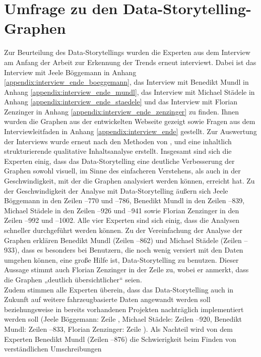 \section{Umfrage zu den Data-Storytelling-Graphen}
Zur Beurteilung des Data-Storytellings wurden die Experten aus dem Interview am Anfang der Arbeit zur Erkennung der Trends erneut interviewt. Dabei ist das Interview mit Jeele Böggemann in Anhang \ref{appendix:interview_ende_boeggemann}, das Interview mit Benedikt Mundl in Anhang \ref{appendix:interview_ende_mundl}, das Interview mit Michael Städele in Anhang \ref{appendix:interview_ende_staedele} und das Interview mit Florian Zenzinger in Anhang \ref{appendix:interview_ende_zenzinger} zu finden. Ihnen wurden die Graphen aus der entwickelten Webseite gezeigt sowie Fragen aus dem Interviewleitfaden in Anhang \ref{appendix:interview_ende} gestellt. Zur Auswertung der Interviews wurde erneut nach den Methoden von \cite{Mayring.2022}, \cite{Kuckartz.2022} und \cite{AndreMorgensternEinenkel.2023} eine inhaltlich strukturierende qualitative Inhaltsanalyse erstellt. Insgesamt sind sich die Experten einig, dass das Data-Storytelling eine deutliche Verbesserung der Graphen sowohl visuell, im Sinne des einfacheren Verstehens, als auch in der Geschwindigkeit, mit der die Graphen analysiert werden können, erreicht hat. Zu der Geschwindigkeit der Analyse mit Data-Storytelling äußern sich Jeele Böggemann in den Zeilen --770 und --786, Benedikt Mundl in den Zeilen --839, Michael Städele in den Zeilen --926 und --941 sowie Florian Zenzinger in den Zeilen --992 und --1002. Alle vier Experten sind sich einig, dass die Analysen schneller durchgeführt werden können. Zu der Vereinfachung der Analyse der Graphen erklären Benedikt Mundl (Zeilen --862) und Michael Städele (Zeilen --933), dass es besonders bei Benutzern, die noch wenig versiert mit den Daten umgehen können, eine große Hilfe ist, Data-Storytelling zu benutzen. Dieser Aussage stimmt auch Florian Zenzinger in der Zeile  zu, wobei er anmerkt, dass die Graphen „deutlich übersichtlicher“ seien.\\ Zudem stimmen alle Experten überein, dass das Data-Storytelling auch in Zukunft auf weitere fahrzeugbasierte Daten angewandt werden soll beziehungsweise in bereits vorhandenen Projekten nachträglich implementiert werden soll (Jeele Böggemann: Zeile , Michael Städele: Zeilen --920, Benedikt Mundl: Zeilen --833, Florian Zenzinger: Zeile ). Als Nachteil wird von dem Experten Benedikt Mundl (Zeilen --876) die Schwierigkeit beim Finden von verständlichen Umschreibungen 